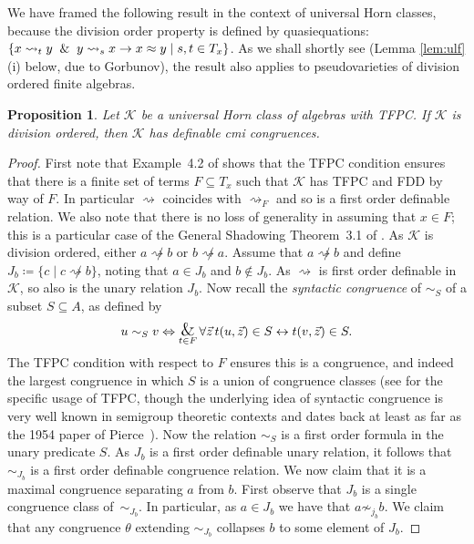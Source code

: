 \documentclass[10pt,a4paper]{amsart}
\theoremstyle{plain}
\newtheorem{pro}[thm]{Proposition}
\theoremstyle{definition}
\newcommand{\divides}{\rightsquigarrow}
\newcommand{\bigand}{\operatornamewithlimits{\hbox{\Large$\&$}}}
\begin{document}
We have framed the following result in the context of universal Horn classes, because the division order property is defined by quasiequations: $\{x\divides_t y\And y\divides_s x\rightarrow x\approx y\mid s,t\in T_x\}$.   As we shall shortly see (Lemma \ref{lem:ulf}(i) below, due to Gorbunov), the result also applies to pseudovarieties of division ordered finite algebras.  
\begin{pro}\label{pro:divisionordered}
Let $\mathscr{K}$ be a universal Horn class of algebras with TFPC.  If $\mathscr{K}$ is division ordered, then $\mathscr{K}$ has definable cmi congruences.
\end{pro}
\begin{proof}
First note that Example~4.2 of \cite{jactro10} shows that the TFPC condition ensures that there is a finite set of terms $F\subseteq T_x$ such that $\mathscr{K}$ has TFPC and FDD by way of $F$. In particular $\divides$ coincides with $\divides_{F}$ and so is a first order definable relation.  We also note that there is no loss of generality in assuming that $x\in F$; this is a particular case of the General Shadowing Theorem~3.1 of \cite{CDFJ}.
As $\mathscr{K}$ is division ordered, either $a\not\divides b$ or $b\not\divides a$.  Assume that $a\not\divides b$ and define $J_b\coloneqq \{c\mid c\not\divides b\}$, noting that $a\in J_b$ and $b\notin J_b$.  As $\divides$ is first order definable in $\mathscr{K}$, so also is the unary relation $J_b$.  Now recall the \emph{syntactic congruence} of $\sim_{S}$ of a subset $S\subseteq A$, as defined by 
\[
u\sim_{S}v\Leftrightarrow \bigand_{t\in F}\forall \vec{z}\, t(u,\vec{z})\in S\leftrightarrow t(v,\vec{z})\in S.
\]
The TFPC condition with respect to $F$ ensures this is a congruence, and indeed the largest congruence in which $S$ is a union of congruence classes (see \cite[Corollary~2.4]{CDFJ} for the specific usage of TFPC, though the underlying idea of syntactic congruence is very well known in semigroup theoretic contexts and dates back at least as far as the 1954 paper of Pierce~\cite{pie}).  
Now the relation $\sim_S$ is a first order formula in the unary predicate $S$.  
As $J_b$ is a first order definable unary relation, it follows that $\sim_{J_b}$ is a first order definable congruence relation.  
We now claim that it is a maximal congruence separating $a$ from $b$.  
First observe that $J_b$ is a single congruence class of~$\sim_{J_b}$. 
In particular, as $a\in J_b$ we have that $a\not\sim_{j_b}b$.  
We claim that any congruence $\theta$ extending $\sim_{J_b}$ collapses $b$ to some element of $J_b$.  

\end{proof}
\end{document}
